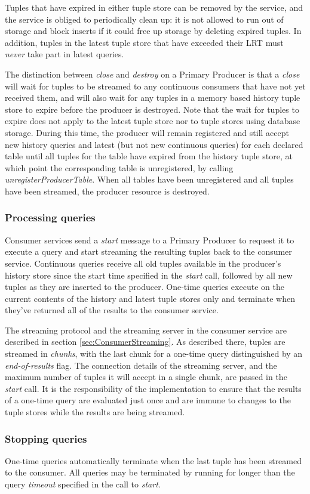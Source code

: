 Tuples that have expired in either tuple store can be removed by the service,
and the service is obliged to periodically clean up: it is not allowed to run
out of storage and block inserts if it could free up storage by deleting
expired tuples. In addition, tuples in the latest tuple store that have
exceeded their LRT must \textit{never} take part in latest queries.

The distinction between \textit{close} and
\textit{destroy} on a Primary Producer is that a \textit{close} 
will wait for tuples to be streamed to any continuous consumers that have not 
yet received them, and will also wait for any tuples in a memory based history 
tuple store to expire before the producer is destroyed. Note that the wait for 
tuples to expire does not apply to the latest tuple store nor to tuple stores 
using database storage. During this time, the producer will remain registered 
and still accept new history queries and latest (but not new continuous 
queries) for each declared table until all tuples for the table have expired 
from the history tuple store, at which point the corresponding table is 
unregistered, by calling \textit{unregisterProducerTable}. When all tables have 
been unregistered and all tuples have been streamed, the producer resource is 
destroyed.

\subsubsection{Processing queries}\label{sec:PrimaryProducerQueryProcessing}

Consumer services send a \textit{start} message to a Primary Producer
to request it to execute a query and start streaming the resulting
tuples back to the consumer service. Continuous queries receive all old tuples
available in the producer's history store since the start time specified in the
\textit{start} call, followed by all new tuples as they are inserted to the
producer. One-time queries execute on the current
contents of the history and latest tuple stores only and terminate when they've
returned all of the results to the consumer service.

The streaming protocol and the streaming server in the consumer service are
described in section \ref{sec:ConsumerStreaming}. As described there, tuples
are streamed in \textit{chunks}, with the last chunk for a one-time query
distinguished by an \textit{end-of-results} flag.
The connection details of the streaming server, and the maximum
number of tuples it will accept in a single chunk, are passed in the
\textit{start} call. It is the responsibility of the implementation to ensure
that the results of a one-time query are evaluated just once and are immune to
changes to the tuple stores while the results are being streamed.

\subsubsection{Stopping queries}\label{sec:PrimaryProducerStoppingQueries}

One-time queries automatically terminate when the last tuple has been
streamed to the consumer. All queries may be terminated by running
for longer than the query \textit{timeout} specified in the call to
\textit{start}.
